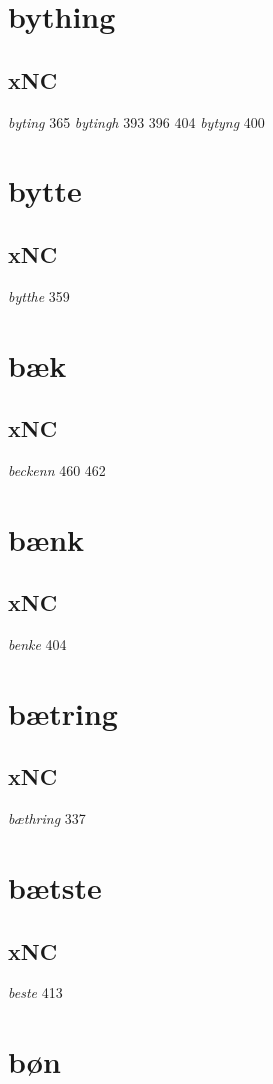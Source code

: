 \documentclass[a4paper,twocolumn]{article}
\begin{document}
\section{bything}
\label{sec:org3a6c6d6}
\subsection{xNC}
\label{sec:org95167a9}
\emph{byting} 365 \emph{bytingh} 393 396 404 \emph{bytyng} 400 
\section{bytte}
\label{sec:org45c0363}
\subsection{xNC}
\label{sec:org11d62d6}
\emph{bytthe} 359 
\section{bæk}
\label{sec:orga56c320}
\subsection{xNC}
\label{sec:orgc9e2db3}
\emph{beckenn} 460 462 
\section{bænk}
\label{sec:org75c01e2}
\subsection{xNC}
\label{sec:orgf02222e}
\emph{benke} 404 
\section{bætring}
\label{sec:org8774549}
\subsection{xNC}
\label{sec:orgb91dc00}
\emph{bæthring} 337 
\section{bætste}
\label{sec:org5b1550a}
\subsection{xNC}
\label{sec:orge40e971}
\emph{beste} 413 
\section{bøn}
\label{sec:org67c788c}
\end{document}
